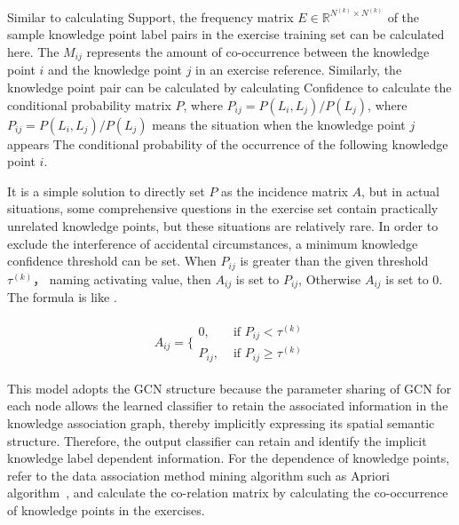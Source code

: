 Similar to calculating Support, the frequency matrix \(E\in \mathbb{R}^{N^{(k)}\times N^{(k)}}\) of the sample knowledge point label pairs in the exercise training set can be calculated here. The \(M_{ij}\) represents the amount of co-occurrence between the knowledge point \(i\) and the knowledge point \(j\) in an exercise reference. Similarly, the knowledge point pair can be calculated by calculating Confidence to calculate the conditional probability matrix \(P\), where \(P_{ij}=P(L_i, L_j)/P(L_j)\), where \(P_{ij}=P(L_i, L_j)/P(L_j)\) means the situation when the knowledge point \(j\) appears The conditional probability of the occurrence of the following knowledge point \(i\).

It is a simple solution to directly set \(P\) as the incidence matrix \(A\), but in actual situations, some comprehensive questions in the exercise set contain practically unrelated knowledge points, but these situations are relatively rare. In order to exclude the interference of accidental circumstances, a minimum knowledge confidence threshold can be set. When \(P_{ij}\) is greater than the given threshold \(\tau^{(k)} \)， naming activating value, then \(A_{ij}\) is set to \(P_{ij}\), Otherwise \(A_{ij}\) is set to 0. The formula is like \eqname{\ref{fml:confidence}}.

\begin{align}
    A_{ij}=\{\begin{array}{ll}
        0,      & \text{ if } P_{ij}<\tau^{(k)}      \\
        P_{ij}, & \text{ if } P_{ij} \geq \tau^{(k)}
    \end{array}\label{fml:confidence}
\end{align}



This model adopts the GCN structure because the parameter sharing of GCN for each node allows the learned classifier to retain the associated information in the knowledge association graph, thereby implicitly expressing its spatial semantic structure. Therefore, the output classifier can retain and identify the implicit knowledge label dependent information. For the dependence of knowledge points, refer to the data association method mining algorithm such as Apriori algorithm~\cite{panjaitan2019implementation}, and calculate the co-relation matrix by calculating the co-occurrence of knowledge points in the exercises.


